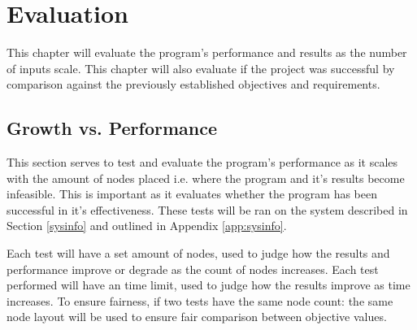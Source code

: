 \chapter{Evaluation}\label{Evaluation}

\ifpdf
    \graphicspath{{Chapter5/Figs/Raster/}{Chapter5/Figs/PDF/}{Chapter5/Figs/}}
\else
    \graphicspath{{Chapter5/Figs/Vector/}{Chapter5/Figs/}}
\fi

This chapter will evaluate the program's performance and results as the number of inputs scale. This chapter will also evaluate if the project was successful by comparison against the previously established objectives and requirements.

\section{Growth vs. Performance}
This section serves to test and evaluate the program's performance as it scales with the amount of nodes placed i.e. where the program and it's results become infeasible. This is important as it evaluates whether the program has been successful in it's effectiveness. These tests will be ran on the system described in Section \ref{sysinfo} and outlined in Appendix \ref{app:sysinfo}.

Each test will have a set amount of nodes, used to judge how the results and performance improve or degrade as the count of nodes increases. Each test performed will have an time limit, used to judge how the results improve as time increases. To ensure fairness, if two tests have the same node count: the same node layout will be used to ensure fair comparison between objective values.

